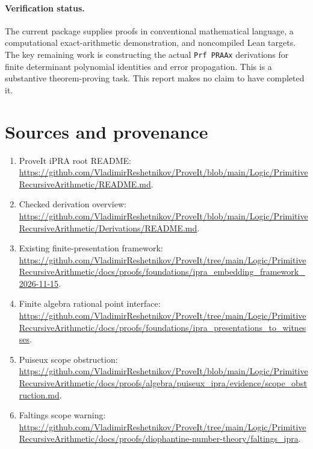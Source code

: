 \documentclass[11pt]{article}
\begin{document}
\paragraph{Verification status.} The current package supplies proofs in conventional mathematical language, a computational exact-arithmetic demonstration, and noncompiled Lean targets. The key remaining work is constructing the actual \texttt{Prf PRAAx} derivations for finite determinant polynomial identities and error propagation. This is a substantive theorem-proving task. This report makes no claim to have completed it.

\section{Sources and provenance}
\begin{enumerate}[leftmargin=*]
\item ProveIt iPRA root README: \url{https://github.com/VladimirReshetnikov/ProveIt/blob/main/Logic/PrimitiveRecursiveArithmetic/README.md}.
\item Checked derivation overview: \url{https://github.com/VladimirReshetnikov/ProveIt/blob/main/Logic/PrimitiveRecursiveArithmetic/Derivations/README.md}.
\item Existing finite-presentation framework: \url{https://github.com/VladimirReshetnikov/ProveIt/tree/main/Logic/PrimitiveRecursiveArithmetic/docs/proofs/foundations/ipra_embedding_framework_2026-11-15}.
\item Finite algebra rational point interface: \url{https://github.com/VladimirReshetnikov/ProveIt/tree/main/Logic/PrimitiveRecursiveArithmetic/docs/proofs/foundations/ipra_presentations_to_witnesses}.
\item Puiseux scope obstruction: \url{https://github.com/VladimirReshetnikov/ProveIt/blob/main/Logic/PrimitiveRecursiveArithmetic/docs/proofs/algebra/puiseux_ipra/evidence/scope_obstruction.md}.
\item Faltings scope warning: \url{https://github.com/VladimirReshetnikov/ProveIt/tree/main/Logic/PrimitiveRecursiveArithmetic/docs/proofs/diophantine-number-theory/faltings_ipra}.
\end{enumerate}
\end{document}
